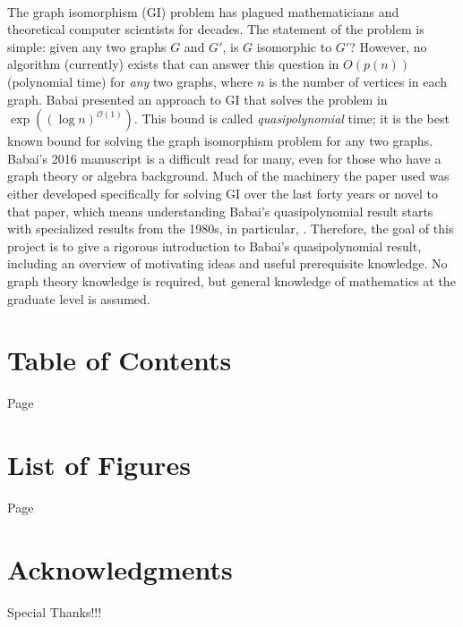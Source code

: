 \paragraph{}

The graph isomorphism (GI) problem has plagued mathematicians and theoretical computer scientists for decades. The statement of the problem is simple: given any two graphs $G$ and $G'$, is $G$ isomorphic to $G'$? However, no algorithm (currently) exists that can answer this question in $O(p(n))$ (polynomial time) for \textit{any} two graphs, where $n$ is the number of vertices in each graph. Babai presented an approach to GI that solves the problem in $\exp\left((\log n)^{\mathcal{O}(1)}\right)$\cite{babai2016,babai2018}. This bound is called \textit{quasipolynomial} time; it is the best known bound for solving the graph isomorphism problem for any two graphs. \\
Babai's 2016 manuscript is a difficult read for many, even for those who have a graph theory or algebra background. Much of the machinery the \cite{babai2016} paper used was either developed specifically for solving GI over the last forty years or novel to that paper, which means understanding Babai's quasipolynomial result starts with specialized results from the 1980s, in particular, \cite{luks1982}. Therefore, the goal of this project is to give a rigorous introduction to Babai's quasipolynomial result, including an overview of motivating ideas and useful prerequisite knowledge. No graph theory knowledge is required, but general knowledge of mathematics at the graduate level is assumed.

\par
{}
\setcounter{page}{3}
\newpage



\section*{Table of Contents}            %
\singlespacing
\hfill Page
\setcounter{page}{5}
\tableofcontents

\makeatletter
{}
\makeatother

\doublespacing
\newpage

\section*{List of Figures}              %

\hfill Page
\setcounter{page}{7} %
\makeatletter
{}
\makeatother

\clearpage\mbox{}\clearpage

\section*{Acknowledgments}
Special Thanks!!!
\newpage
